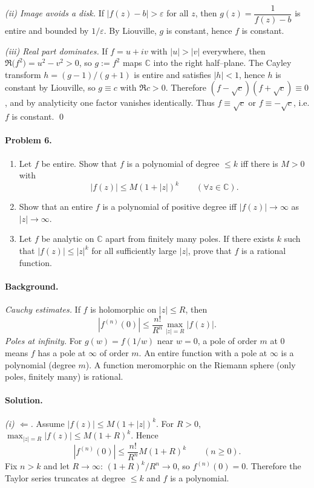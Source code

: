 \documentclass[11pt,a4paper]{article}
\theoremstyle{definition}
\theoremstyle{definition}
\theoremstyle{plain}
\theoremstyle{remark}
\begin{document}
\medskip
\emph{(ii) Image avoids a disk.}
If $|f(z)-b|>\varepsilon$ for all $z$, then $g(z)=\dfrac{1}{f(z)-b}$ is entire and bounded by $1/\varepsilon$.
By Liouville, $g$ is constant, hence $f$ is constant.

\medskip
\emph{(iii) Real part dominates.}
If $f=u+iv$ with $|u|>|v|$ everywhere, then $\Re\big(f^2\big)=u^2-v^2>0$, so $g:=f^2$ maps $\mathbb C$ into the right half–plane.
The Cayley transform $h=(g-1)/(g+1)$ is entire and satisfies $|h|<1$, hence $h$ is constant by Liouville, so $g\equiv c$ with $\Re c>0$.
Therefore $(f-\sqrt c)(f+\sqrt c)\equiv 0$, and by analyticity one factor vanishes identically.
Thus $f\equiv \sqrt c$ or $f\equiv -\sqrt c$, i.e. $f$ is constant.
\qed

\paragraph{Problem 6.}
\begin{enumerate}[label=(\roman*)]
	\item Let $f$ be entire. Show that $f$ is a polynomial of degree $\le k$ iff there is $M>0$ with
	\[
	|f(z)|\le M(1+|z|)^k\qquad(\forall z\in\mathbb C).
	\]
	\item Show that an entire $f$ is a polynomial of positive degree iff $|f(z)|\to\infty$ as $|z|\to\infty$.
	\item Let $f$ be analytic on $\mathbb C$ apart from finitely many poles. If there exists $k$ such that
	$|f(z)|\le |z|^k$ for all sufficiently large $|z|$, prove that $f$ is a rational function.
\end{enumerate}

\paragraph{Background.}
\emph{Cauchy estimates.} If $f$ is holomorphic on $|z|\le R$, then
\[
|f^{(n)}(0)|\le \frac{n!}{R^n}\max_{|z|=R}|f(z)|.
\]
\emph{Poles at infinity.} For $g(w)=f(1/w)$ near $w=0$, a pole of order $m$ at $0$ means $f$ has a pole at $\infty$ of order $m$. An entire function with a pole at $\infty$ is a polynomial (degree $m$). A function meromorphic on the Riemann sphere (only poles, finitely many) is rational.

\paragraph{Solution.}
\emph{(i) $\Leftarrow$.}
Assume $|f(z)|\le M(1+|z|)^k$. For $R>0$, $\max_{|z|=R}|f(z)|\le M(1+R)^k$. Hence
\[
|f^{(n)}(0)|\le \frac{n!}{R^n}M(1+R)^k \qquad (n\ge 0).
\]
Fix $n>k$ and let $R\to\infty$: $(1+R)^k/R^n\to 0$, so $f^{(n)}(0)=0$. Therefore the Taylor series truncates at degree $\le k$ and $f$ is a polynomial.
\end{document}
